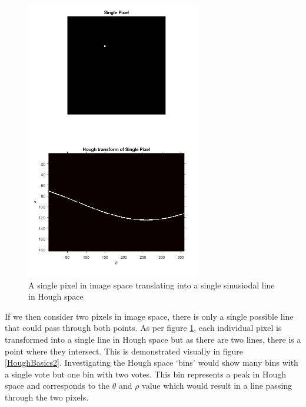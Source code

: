 \documentclass{article}
\begin{document}
	\begin{figure}
		\centering
		\includegraphics[width=3.0in]{HoughBasics}
		\caption{A single pixel in image space translating into a single sinusiodal line in Hough space}
		\label{HoughBasics}
	\end{figure}
	
	
	If we then consider two pixels in image space, there is only a single possible line that could pass through both points. As per figure \ref{HoughBasics}, each individual pixel is transformed into a single line in Hough space but as there are two lines, there is a point where they intersect. This is demonstrated visually in figure \ref{HoughBasics2}. Investigating the Hough space `bins' would show many bins with a single vote but one bin with two votes. This bin represents a peak in Hough space and corresponds to the $\theta$ and $\rho$ value which would result in a line passing through the two pixels.
	
	
\end{document}
